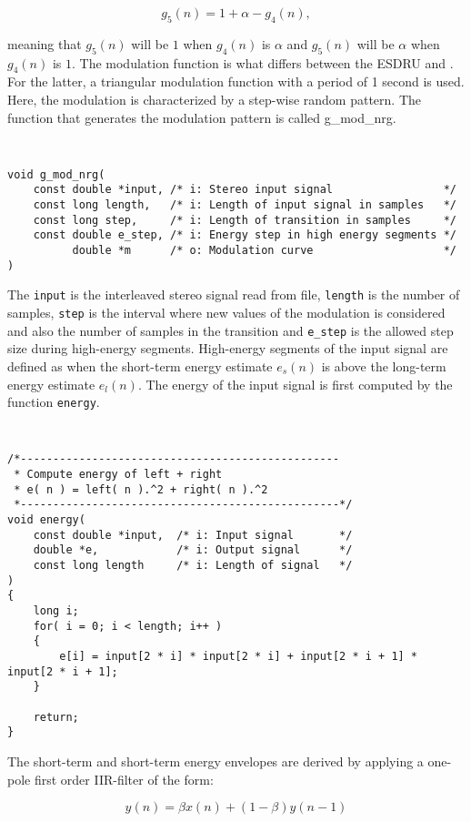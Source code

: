   \[
    g_5(n) = 1 + \alpha - g_4(n),
  \]
  
meaning that $g_5(n)$ will be $1$ when $g_4(n)$ is $\alpha$ and $g_5(n)$ will be $\alpha$
 when $g_4(n)$ is $1$. The modulation function is what differs between the ESDRU and
\cite{SDRU}. For the latter, a triangular modulation function with a period of 1 second
is used. Here, the modulation is characterized by a step-wise random pattern. The function
that generates the modulation pattern is called g\_mod\_nrg.

{\tt\small
\begin{verbatim}
void g_mod_nrg(
    const double *input, /* i: Stereo input signal                 */
    const long length,   /* i: Length of input signal in samples   */
    const long step,     /* i: Length of transition in samples     */
    const double e_step, /* i: Energy step in high energy segments */
          double *m      /* o: Modulation curve                    */
)
\end{verbatim}
}

The \texttt{input} is the interleaved stereo signal read from file, \texttt{length} is the number
of samples, \texttt{step} is the interval where new values of the modulation is considered and also
the number of samples in the transition and \texttt{e\_step} is the allowed step size during high-energy
segments. High-energy segments of the input signal are defined as when the short-term energy estimate 
$e_s(n)$ is above the long-term energy estimate $e_l(n)$. The energy of the input signal is first computed
by the function \texttt{energy}.

{\tt\small
\begin{verbatim}
/*-------------------------------------------------
 * Compute energy of left + right
 * e( n ) = left( n ).^2 + right( n ).^2
 *-------------------------------------------------*/
void energy(
    const double *input,  /* i: Input signal       */
    double *e,            /* i: Output signal      */
    const long length     /* i: Length of signal   */
)
{
    long i;
    for( i = 0; i < length; i++ )
    {
        e[i] = input[2 * i] * input[2 * i] + input[2 * i + 1] * input[2 * i + 1];
    }

    return;
} 
\end{verbatim}
}

The short-term and short-term energy envelopes are derived by applying a one-pole first order IIR-filter
of the form:

  \[
    y(n) = \beta x(n) + (1 - \beta) y(n-1)
  \]

